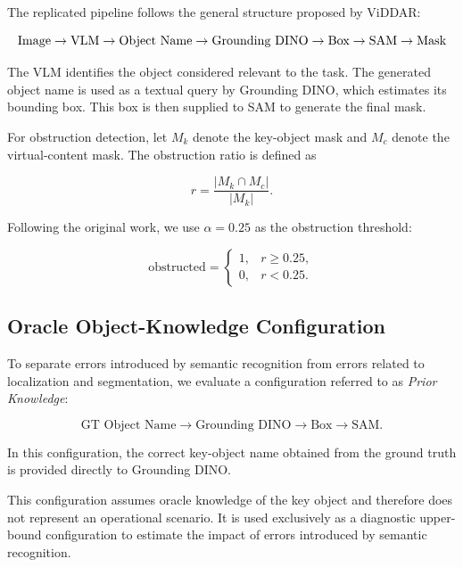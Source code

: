 \documentclass[conference]{IEEEtran}
\begin{document}
The replicated pipeline follows the general structure proposed by ViDDAR:

\begin{equation*}
\resizebox{\columnwidth}{!}{$
\text{Image} \rightarrow \text{VLM} \rightarrow
\text{Object Name} \rightarrow \text{Grounding DINO} \rightarrow
\text{Box} \rightarrow \text{SAM} \rightarrow \text{Mask}
$}
\end{equation*}

The VLM identifies the object considered relevant to the task. The generated object name is used as a textual query by Grounding DINO, which estimates its bounding box. This box is then supplied to SAM to generate the final mask.

For obstruction detection, let $M_k$ denote the key-object mask and $M_c$ denote the virtual-content mask. The obstruction ratio is defined as

\begin{equation}
r =
\frac{|M_k \cap M_c|}
{|M_k|}.
\end{equation}

Following the original work, we use $\alpha=0.25$ as the obstruction threshold:

\begin{equation}
\text{obstructed} =
\begin{cases}
1, & r \geq 0.25,\\
0, & r < 0.25.
\end{cases}
\end{equation}


\subsection{Oracle Object-Knowledge Configuration}

To separate errors introduced by semantic recognition from errors related to localization and segmentation, we evaluate a configuration referred to as \textit{Prior Knowledge}:

\begin{equation*}
\text{GT Object Name} \rightarrow
\text{Grounding DINO} \rightarrow
\text{Box} \rightarrow
\text{SAM}.
\end{equation*}

In this configuration, the correct key-object name obtained from the ground truth is provided directly to Grounding DINO.

This configuration assumes oracle knowledge of the key object and therefore does not represent an operational scenario. It is used exclusively as a diagnostic upper-bound configuration to estimate the impact of errors introduced by semantic recognition.
\end{document}
